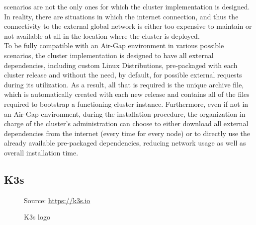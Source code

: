 scenarios are not the only ones for which the cluster implementation is designed.
In reality, there are situations in which the internet connection, and thus the
connectivity to the external global network is either too expensive to maintain
or not available at all in the location where the cluster is deployed. \\ %
To be fully compatible with an Air-Gap environment in various possible scenarios,
the cluster implementation is designed to have all external dependencies,
including custom Linux Distributions, pre-packaged with each cluster release and
without the need, by default, for possible external requests during its utilization.
As a result, all that is required is the unique archive file, which is
automatically created with each new release and contains all of the files
required to bootstrap a functioning cluster instance. Furthermore, even if not
in an Air-Gap environment, during the installation procedure, the organization
in charge of the cluster's administration can choose to either download all
external dependencies from the internet (every time for every node) or to
directly use the already available pre-packaged dependencies, reducing network usage
as well as overall installation time.

\subsection{K3s}
\label{subsec:implementation_dependencies_k3s}

\begin{figure} %
  \centering
  \def\stackalignment{l} %
  {\scriptsize \parbox[t]{\linewidth}{ Source: \url{https://k3s.io}} }
  \caption{K3s logo}
\end{figure}

